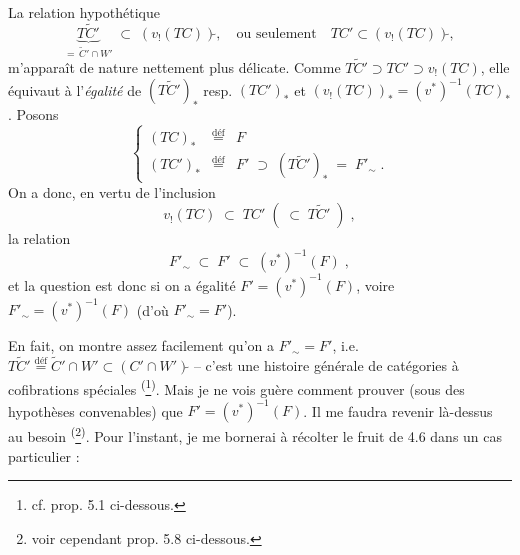 \documentclass[11pt]{article}
\newcommand{\msp}[1]{\marginpar{\footnotesize [#1]}}
\newcommand{\defeq}{\overset{\text{déf}}{=}}
\begin{document}
La relation hypothétique
\[
\underbrace{T\tilde{C}'}_{=\,\tilde{C}'\cap W'} \;\subset\; (v_{!}(TC))\tilde{}, \quad \text{ou seulement} \quad TC' \subset (v_{!}(TC))\tilde{},
\tag*{$(*)$}
\]
m'apparaît de nature nettement plus délicate. Comme $T\tilde{C}' \supset TC' \supset v_{!}(TC)$, elle équivaut à l'\textit{égalité} de $(T\tilde{C}')_{*}$ resp. $(TC')_{*}$ et $(v_{!}(TC))_{*} = (v^{*})^{-1}(TC)_{*}$. Posons
\[
\left\{
\begin{array}{lcl}
(TC)_{*} & \defeq & F \\
(TC')_{*} & \defeq & F' \;\supset\; (T\tilde{C}')_{*} \;=\; F'_{\sim} \; .
\end{array}
\right.
\tag*{(4.7.5)}
\]
On a donc, en vertu de l'inclusion
\[
v_{!}(TC) \;\subset\; TC' \; ( \;\subset\; T\tilde{C}' \; ) \; ,
\]
la relation
\[
F'_{\sim} \;\subset\; F' \;\subset\; (v^{*})^{-1}(F) \; ,
\tag*{(4.7.6)}
\]
et la question est donc si on a égalité $F' = (v^{*})^{-1}(F)$, voire $F'_{\sim} = (v^{*})^{-1}(F)$ (d'où $F'_{\sim} = F'$).

\msp{page 81}

En fait, on montre assez facilement qu'on a $F'_{\sim} = F'$, i.e. $T\tilde{C}' \defeq \tilde{C}' \cap W' \subset (C' \cap W')\tilde{}$ -- c'est une histoire générale de catégories à cofibrations spéciales \textsuperscript{(}\footnote[21]{cf. prop. 5.1 ci-dessous.}\textsuperscript{)}. Mais je ne vois guère comment prouver (sous des hypothèses convenables) que $F' = (v^{*})^{-1}(F)$. Il me faudra revenir là-dessus au besoin \textsuperscript{(}\footnote[22]{voir cependant prop. 5.8 ci-dessous.}\textsuperscript{)}. Pour l'instant, je me bornerai à récolter le fruit de 4.6 dans un cas particulier :
\end{document}
